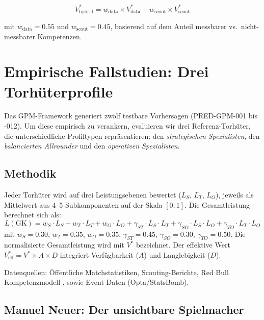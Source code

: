 \documentclass[12pt,a4paper]{article}
\begin{document}
\begin{equation}
\label{eq:hybrid}
V^{*}_{\text{hybrid}} = w_{\text{data}} \times V^{*}_{\text{data}} + w_{\text{scout}} \times V^{*}_{\text{scout}}
\end{equation}

\noindent mit $w_{\text{data}} = 0.55$ und $w_{\text{scout}} = 0.45$, basierend auf dem Anteil messbarer vs.\ nicht-messbarer Kompetenzen.


\section{Empirische Fallstudien: Drei Torh\"uterprofile}
\label{sec:fallstudien}

Das GPM-Framework generiert zw\"olf testbare Vorhersagen (PRED-GPM-001 bis -012). Um diese empirisch zu verankern, evaluieren wir drei Referenz-Torh\"uter, die unterschiedliche Profiltypen repr\"asentieren: den \emph{strategischen Spezialisten}, den \emph{balancierten Allrounder} und den \emph{operativen Spezialisten}.

\subsection{Methodik}

Jeder Torh\"uter wird auf drei Leistungsebenen bewertet ($L_S$, $L_T$, $L_O$), jeweils als Mittelwert aus 4--5 Subkomponenten auf der Skala $[0,1]$. Die Gesamtleistung berechnet sich als:
\[
L(\text{GK}) = w_S \cdot L_S + w_T \cdot L_T + w_O \cdot L_O + \gamma_{ST} \cdot L_S \cdot L_T + \gamma_{SO} \cdot L_S \cdot L_O + \gamma_{TO} \cdot L_T \cdot L_O
\]
mit $w_S = 0.30$, $w_T = 0.35$, $w_O = 0.35$, $\gamma_{ST} = 0.45$, $\gamma_{SO} = 0.30$, $\gamma_{TO} = 0.50$. Die normalisierte Gesamtleistung wird mit $V^{*}$ bezeichnet. Der effektive Wert $V^{*}_{\text{eff}} = V^{*} \times A \times D$ integriert Verf\"ugbarkeit ($A$) und Langlebigkeit ($D$).

Datenquellen: \"Offentliche Matchstatistiken, Scouting-Berichte, Red Bull Kompetenzmodell \citep{wagner2023scouting}, sowie Event-Daten (Opta/StatsBomb).

\subsection{Manuel Neuer: Der unsichtbare Spielmacher}
\label{sec:cs_neuer}
\end{document}
